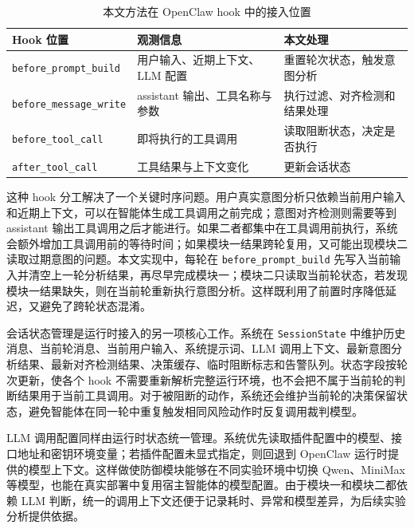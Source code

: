 \begin{table}[htbp]
  \centering
  \caption{本文方法在 OpenClaw hook 中的接入位置}
  \label{tab:chap04-hook-integration}
  \small
  \renewcommand{\arraystretch}{1.25}
  \begin{tabular}{@{}p{}p{}p{}@{}}
    \toprule
    Hook 位置 & 观测信息 & 本文处理 \\
    \midrule
    \texttt{before\_prompt\_build} &
    用户输入、近期上下文、LLM 配置 &
    重置轮次状态，触发意图分析 \\
    \texttt{before\_message\_write} &
    assistant 输出、工具名称与参数 &
    执行过滤、对齐检测和结果处理 \\
    \texttt{before\_tool\_call} &
    即将执行的工具调用 &
    读取阻断状态，决定是否执行 \\
    \texttt{after\_tool\_call} &
    工具结果与上下文变化 &
    更新会话状态 \\
    \bottomrule
  \end{tabular}
\end{table}

这种 hook 分工解决了一个关键时序问题。用户真实意图分析只依赖当前用户输入和近期上下文，可以在智能体生成工具调用之前完成；意图对齐检测则需要等到 assistant 输出工具调用之后才能进行。如果二者都集中在工具调用前执行，系统会额外增加工具调用前的等待时间；如果模块一结果跨轮复用，又可能出现模块二读取过期意图的问题。本文实现中，每轮在 \texttt{before\_prompt\_build} 先写入当前输入并清空上一轮分析结果，再尽早完成模块一；模块二只读取当前轮状态，若发现模块一结果缺失，则在当前轮重新执行意图分析。这样既利用了前置时序降低延迟，又避免了跨轮状态混淆。

会话状态管理是运行时接入的另一项核心工作。系统在 \texttt{SessionState} 中维护历史消息、当前轮消息、当前用户输入、系统提示词、LLM 调用上下文、最新意图分析结果、最新对齐检测结果、决策缓存、临时阻断标志和告警队列。状态字段按轮次更新，使各个 hook 不需要重新解析完整运行环境，也不会把不属于当前轮的判断结果用于当前工具调用。对于被阻断的动作，系统还会维护当前轮的决策保留状态，避免智能体在同一轮中重复触发相同风险动作时反复调用裁判模型。

LLM 调用配置同样由运行时状态统一管理。系统优先读取插件配置中的模型、接口地址和密钥环境变量；若插件配置未显式指定，则回退到 OpenClaw 运行时提供的模型上下文。这样做使防御模块能够在不同实验环境中切换 Qwen、MiniMax 等模型，也能在真实部署中复用宿主智能体的模型配置。由于模块一和模块二都依赖 LLM 判断，统一的调用上下文还便于记录耗时、异常和模型差异，为后续实验分析提供依据。

